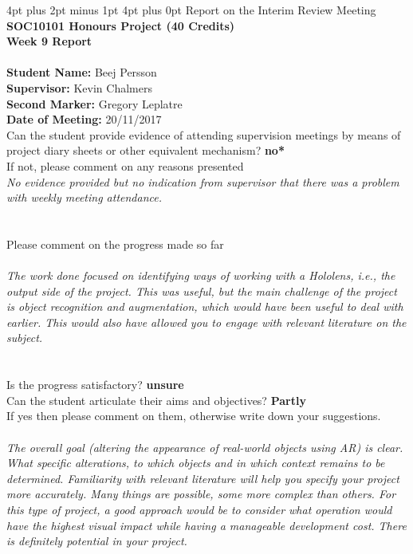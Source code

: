 \documentclass[12pt,a4paper,oneside]{article}
\makeatletter
\renewcommand\section{\@startsection {section}{1}{0mm} %
                               {4pt plus 2pt minus 1pt} %
                               {4pt plus 0pt} %
                               {\Large\bfseries}}
\makeatother
\begin{document}
\begin{appendices}
\section{Report on the Interim Review Meeting}
\ \\ \textbf{SOC10101 Honours Project (40 Credits)} \\                   
\textbf{Week 9 Report} \\ \\
\textbf{Student Name:} Beej Persson \\
\textbf{Supervisor:} Kevin Chalmers \\
\textbf{Second Marker:}  Gregory Leplatre \\
\textbf{Date of Meeting:}  20/11/2017 \\
Can the student provide evidence of attending supervision meetings by means of project diary sheets or other equivalent mechanism?  \textbf{no*} \\
\indent If not, please comment on any reasons presented \\
\textsl{No evidence provided but no indication from supervisor that there was a problem with weekly meeting attendance.} \\ \\ \\
Please comment on the progress made so far \\ \\
\textsl{The work done focused on identifying ways of working with a Hololens, i.e., the output side of the project. This was useful, but the main challenge of the project is object recognition and augmentation, which would have been useful to deal with earlier. This would also have allowed you to engage with relevant literature on the subject.} \\ \\ \\
Is the progress satisfactory? \textbf{unsure} \\
Can the student articulate their aims and objectives? \textbf{Partly} \\
If yes then please comment on them, otherwise write down your suggestions. \\ \\
\textsl{The overall goal (altering the appearance of real-world objects using AR) is clear. What specific alterations, to which objects and in which context remains to be determined. Familiarity with relevant literature will help you specify your project more accurately. Many things are possible, some more complex than others. For this type of project, a good approach would be to consider what operation would have the highest visual impact while having a manageable development cost. There is definitely potential in your project.} \\ \\ \\	

\end{appendices}
\end{document}

